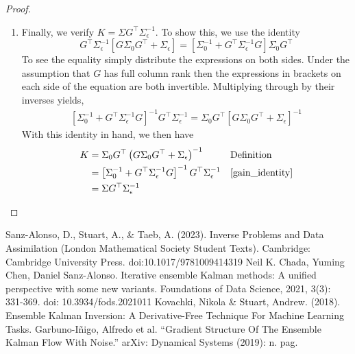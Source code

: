 \documentclass[12pt]{article}
\begin{document}
\begin{proof}
\begin{enumerate}
\item Finally, we verify $K = \Sigma G^\top \Sigma_{\epsilon}^{-1}$. To show this, we use the identity 
\[G^\top \Sigma^{-1}_{\epsilon} \left[G \Sigma_0 G^\top + \Sigma_\epsilon \right] = \left[\Sigma_0^{-1} + G^\top \Sigma^{-1}_{\epsilon}G \right] \Sigma_0 G^\top \]
To see the equality simply distribute the expressions on both sides. Under the assumption that $G$ has full column rank then the expressions in brackets on each side 
of the equation are both invertible. Multiplying through by their inverses yields, 
\begin{align}
\left[\Sigma_0^{-1} + G^\top \Sigma_{\epsilon}^{-1} G \right]^{-1} G^\top \Sigma_{\epsilon}^{-1} = \Sigma_0 G^\top \left[G \Sigma_0 G^\top + \Sigma_{\epsilon} \right]^{-1} \label{gain_identity}
\end{align}
With this identity in hand, we then have 
\begin{align*}
K &= \Sigma_0 G^\top \left(G\Sigma_0 G^\top + \Sigma_\epsilon \right)^{-1} && \text{Definition} \\
   &= \left[\Sigma_0^{-1} + G^\top \Sigma_{\epsilon}^{-1} G \right]^{-1} G^\top \Sigma_{\epsilon}^{-1} &&\ref{gain_identity} \\
   &= \Sigma G^\top \Sigma_{\epsilon}^{-1}
\end{align*}

\end{enumerate}
\end{proof}

\begin{thebibliography}{20}
 Sanz-Alonso, D., Stuart, A., \& Taeb, A. (2023). Inverse Problems and Data Assimilation (London Mathematical Society Student Texts). Cambridge: Cambridge University Press. doi:10.1017/9781009414319
 Neil K. Chada, Yuming Chen, Daniel Sanz-Alonso. Iterative ensemble Kalman methods: A unified perspective with some new variants. Foundations of Data Science, 2021, 3(3): 331-369. doi: 10.3934/fods.2021011
 Kovachki, Nikola & Stuart, Andrew. (2018). Ensemble Kalman Inversion: A Derivative-Free Technique For Machine Learning Tasks. 
 Garbuno-Iñigo, Alfredo et al. “Gradient Structure Of The Ensemble Kalman Flow With Noise.” arXiv: Dynamical Systems (2019): n. pag.
\end{thebibliography}
\end{document}
